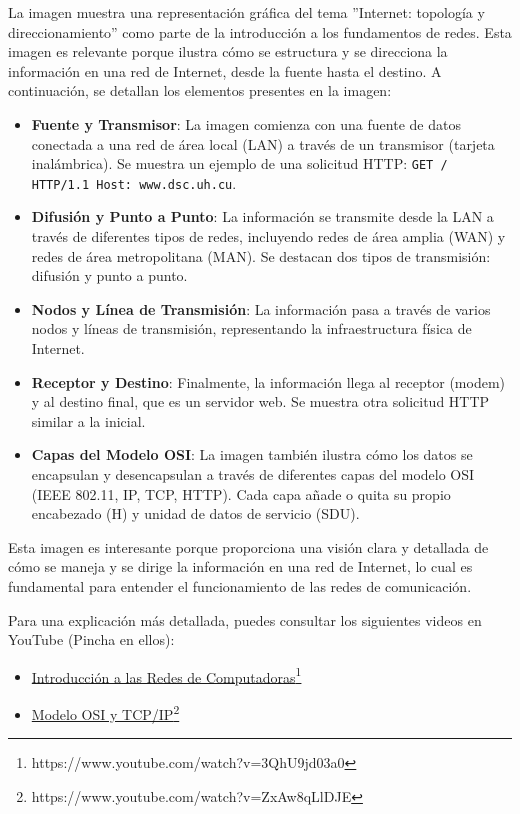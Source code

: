 \documentclass[a4paper,12pt]{article}
\begin{document}
La imagen muestra una representación gráfica del tema ''Internet: topología y direccionamiento'' como parte de la introducción a los fundamentos de redes. Esta imagen es relevante porque ilustra cómo se estructura y se direcciona la información en una red de Internet, desde la fuente hasta el destino. A continuación, se detallan los elementos presentes en la imagen:

\begin{itemize}
    \item \textbf{Fuente y Transmisor}: La imagen comienza con una fuente de datos conectada a una red de área local (LAN) a través de un transmisor (tarjeta inalámbrica). Se muestra un ejemplo de una solicitud HTTP: \texttt{GET / HTTP/1.1 Host: www.dsc.uh.cu}.
    \item \textbf{Difusión y Punto a Punto}: La información se transmite desde la LAN a través de diferentes tipos de redes, incluyendo redes de área amplia (WAN) y redes de área metropolitana (MAN). Se destacan dos tipos de transmisión: difusión y punto a punto.
    \item \textbf{Nodos y Línea de Transmisión}: La información pasa a través de varios nodos y líneas de transmisión, representando la infraestructura física de Internet.
    \item \textbf{Receptor y Destino}: Finalmente, la información llega al receptor (modem) y al destino final, que es un servidor web. Se muestra otra solicitud HTTP similar a la inicial.
    \item \textbf{Capas del Modelo OSI}: La imagen también ilustra cómo los datos se encapsulan y desencapsulan a través de diferentes capas del modelo OSI (IEEE 802.11, IP, TCP, HTTP). Cada capa añade o quita su propio encabezado (H) y unidad de datos de servicio (SDU).
\end{itemize}

Esta imagen es interesante porque proporciona una visión clara y detallada de cómo se maneja y se dirige la información en una red de Internet, lo cual es fundamental para entender el funcionamiento de las redes de comunicación.

Para una explicación más detallada, puedes consultar los siguientes videos en YouTube (Pincha en ellos):
\begin{itemize}
    \item \href{https://www.youtube.com/watch?v=3QhU9jd03a0}{Introducción a las Redes de Computadoras}\footnote{https://www.youtube.com/watch?v=3QhU9jd03a0}
    \item \href{https://www.youtube.com/watch?v=ZxAw8qLlDJE}{Modelo OSI y TCP/IP}\footnote{https://www.youtube.com/watch?v=ZxAw8qLlDJE}
\end{itemize}
\end{document}
